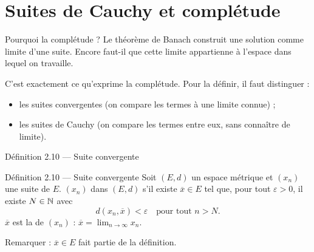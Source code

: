\section{Suites de Cauchy et complétude}

\begin{frame}{Pourquoi la complétude ?}
  \small Le théorème de Banach construit une solution comme
  limite d'une suite. Encore faut-il que cette limite
  appartienne à l'espace dans lequel on travaille.
  \vspace{6pt}

  C'est exactement ce qu'exprime la complétude. Pour la définir,
  il faut distinguer :
  \begin{itemize}
    \item les suites convergentes (on compare les termes à une
      limite connue) ;
    \item les suites de Cauchy (on compare les termes
      entre eux, sans connaître de limite).
  \end{itemize}
\end{frame}

\begin{frame}{Définition 2.10 --- Suite convergente}
  \begin{Enonce}{Définition 2.10 --- Suite convergente}
    Soit $(E,d)$ un espace métrique et $(x_n)$ une suite de $E$. $(x_n)$
     dans $(E,d)$ s'il existe $\overline{x}\in E$ tel que,
    pour tout $\varepsilon>0$, il existe $N\in\operatorname{\mathbb{N}}$ avec
    \[
      d(x_n,\overline{x}) < \varepsilon \quad\text{pour tout } n>N.
    \]
    $\overline{x}$ est la  de $(x_n)$ :
    $\overline{x} = \lim_{n\to\infty}x_n$.
  \end{Enonce}
  \small Remarquer : $\overline{x}\in E$ fait partie de la définition.
\end{frame}

